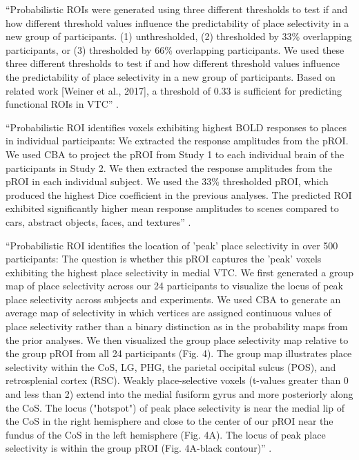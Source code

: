 ``Probabilistic ROIs were generated using three different thresholds to test if
and how different threshold values influence the predictability of place
selectivity in a new group of participants.
%
(1) unthresholded,
%
(2) thresholded by 33\% overlapping participants, or
%
(3) thresholded by 66\% overlapping participants.
%
We used these three different thresholds to test if and how different threshold
values influence the predictability of place selectivity in a new group of
participants. Based on related work [Weiner et al., 2017], a threshold of 0.33
is sufficient for predicting functional ROIs in VTC''
\citep{weiner2018defining}.

``Probabilistic ROI identifies voxels exhibiting highest BOLD responses to
places in individual participants:
%
We extracted the response amplitudes from the pROI.
%
We used CBA to project the pROI from Study 1 to each individual brain of the
participants in Study 2.
%
We then extracted the response amplitudes from the pROI in each individual
subject.
%
We used the 33\% thresholded pROI, which produced the highest Dice coefficient
in the previous analyses.
%
The predicted ROI exhibited significantly higher mean response amplitudes to
scenes compared to cars, abstract objects, faces, and textures''
\citep{weiner2018defining}.



``Probabilistic ROI identifies the location of 'peak' place selectivity in over
500 participants:
%
The question is whether this pROI captures the 'peak' voxels exhibiting the
highest place selectivity in medial VTC.
%
We first generated a group map of place selectivity across our 24 participants
to visualize the locus of peak place selectivity across subjects and
experiments.
%
We used CBA to generate an average map of selectivity in which vertices are
assigned continuous values of place selectivity rather than a binary distinction
as in the probability maps from the prior analyses.
%
We then visualized the group place selectivity map relative to the group pROI
from all 24 participants (Fig. 4).
%
The group map illustrates place selectivity within the CoS, LG, PHG, the
parietal occipital sulcus (POS), and retrosplenial cortex (RSC).
%
Weakly place-selective voxels (t-values greater than 0 and less than 2) extend
into the medial fusiform gyrus and more posteriorly along the CoS.
%
The locus ("hotspot") of peak place selectivity is near the medial lip of the
CoS in the right hemisphere and close to the center of our pROI near the fundus
of the CoS in the left hemisphere (Fig. 4A).
%
The locus of peak place selectivity is within the group pROI (Fig. 4A-black
contour)'' \citep{weiner2018defining}.

